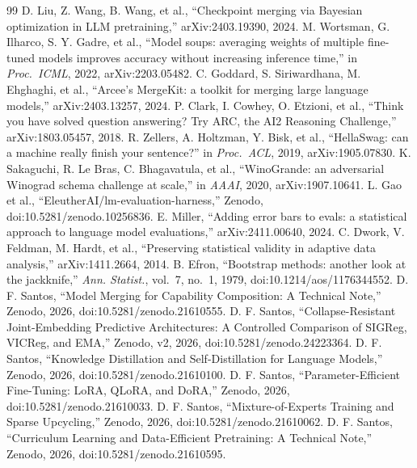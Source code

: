 \documentclass[conference]{IEEEtran}
\begin{document}
\begin{thebibliography}{99}
 D. Liu, Z. Wang, B. Wang, et al., ``Checkpoint merging via Bayesian optimization in LLM pretraining,'' arXiv:2403.19390, 2024.
 M. Wortsman, G. Ilharco, S. Y. Gadre, et al., ``Model soups: averaging weights of multiple fine-tuned models improves accuracy without increasing inference time,'' in \emph{Proc.\ ICML}, 2022, arXiv:2203.05482.
 C. Goddard, S. Siriwardhana, M. Ehghaghi, et al., ``Arcee's MergeKit: a toolkit for merging large language models,'' arXiv:2403.13257, 2024.
 P. Clark, I. Cowhey, O. Etzioni, et al., ``Think you have solved question answering? Try ARC, the AI2 Reasoning Challenge,'' arXiv:1803.05457, 2018.
 R. Zellers, A. Holtzman, Y. Bisk, et al., ``HellaSwag: can a machine really finish your sentence?'' in \emph{Proc.\ ACL}, 2019, arXiv:1905.07830.
 K. Sakaguchi, R. Le Bras, C. Bhagavatula, et al., ``WinoGrande: an adversarial Winograd schema challenge at scale,'' in \emph{AAAI}, 2020, arXiv:1907.10641.
 L. Gao et al., ``EleutherAI/lm-evaluation-harness,'' Zenodo, doi:10.5281/zenodo.10256836.
 E. Miller, ``Adding error bars to evals: a statistical approach to language model evaluations,'' arXiv:2411.00640, 2024.
 C. Dwork, V. Feldman, M. Hardt, et al., ``Preserving statistical validity in adaptive data analysis,'' arXiv:1411.2664, 2014.
 B. Efron, ``Bootstrap methods: another look at the jackknife,'' \emph{Ann. Statist.}, vol.~7, no.~1, 1979, doi:10.1214/aos/1176344552.
 D. F. Santos, ``Model Merging for Capability Composition: A Technical Note,'' Zenodo, 2026, doi:10.5281/zenodo.21610555.
 D. F. Santos, ``Collapse-Resistant Joint-Embedding Predictive Architectures: A Controlled Comparison of SIGReg, VICReg, and EMA,'' Zenodo, v2, 2026, doi:10.5281/zenodo.24223364.
 D. F. Santos, ``Knowledge Distillation and Self-Distillation for Language Models,'' Zenodo, 2026, doi:10.5281/zenodo.21610100.
 D. F. Santos, ``Parameter-Efficient Fine-Tuning: LoRA, QLoRA, and DoRA,'' Zenodo, 2026, doi:10.5281/zenodo.21610033.
 D. F. Santos, ``Mixture-of-Experts Training and Sparse Upcycling,'' Zenodo, 2026, doi:10.5281/zenodo.21610062.
 D. F. Santos, ``Curriculum Learning and Data-Efficient Pretraining: A Technical Note,'' Zenodo, 2026, doi:10.5281/zenodo.21610595.

\end{thebibliography}
\end{document}
